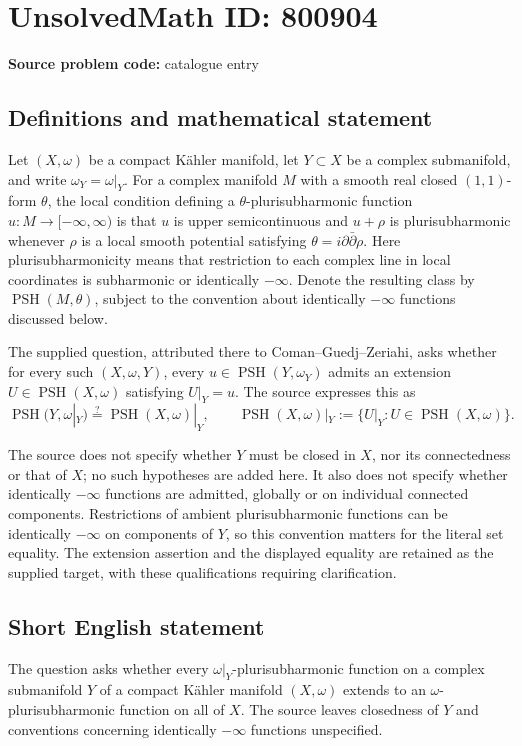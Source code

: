 \documentclass[11pt]{article}
\begin{document}
\section*{UnsolvedMath ID: 800904}
\textbf{Source problem code:} catalogue entry
\subsection{Definitions and mathematical statement}
Let \((X,\omega)\) be a compact K\"ahler manifold, let \(Y\subset X\) be a complex submanifold, and write \(\omega_Y=\omega|_Y\). For a complex manifold \(M\) with a smooth real closed \((1,1)\)-form \(\theta\), the local condition defining a \(\theta\)-plurisubharmonic function \(u:M\to[-\infty,\infty)\) is that \(u\) is upper semicontinuous and \(u+\rho\) is plurisubharmonic whenever \(\rho\) is a local smooth potential satisfying \(\theta=i\partial\bar\partial\rho\). Here plurisubharmonicity means that restriction to each complex line in local coordinates is subharmonic or identically \(-\infty\). Denote the resulting class by \(\operatorname{PSH}(M,\theta)\), subject to the convention about identically \(-\infty\) functions discussed below.

The supplied question, attributed there to Coman--Guedj--Zeriahi, asks whether for every such \((X,\omega,Y)\), every \(u\in\operatorname{PSH}(Y,\omega_Y)\) admits an extension \(U\in\operatorname{PSH}(X,\omega)\) satisfying \(U|_Y=u\). The source expresses this as
\[
\operatorname{PSH}(Y,\omega|_Y)
\stackrel{?}{=}
\operatorname{PSH}(X,\omega)|_Y,
\qquad
\operatorname{PSH}(X,\omega)|_Y
:=\{U|_Y:U\in\operatorname{PSH}(X,\omega)\}.
\]

The source does not specify whether \(Y\) must be closed in \(X\), nor its connectedness or that of \(X\); no such hypotheses are added here. It also does not specify whether identically \(-\infty\) functions are admitted, globally or on individual connected components. Restrictions of ambient plurisubharmonic functions can be identically \(-\infty\) on components of \(Y\), so this convention matters for the literal set equality. The extension assertion and the displayed equality are retained as the supplied target, with these qualifications requiring clarification.
\subsection{Short English statement}
The question asks whether every \(\omega|_Y\)-plurisubharmonic function on a complex submanifold \(Y\) of a compact K\"ahler manifold \((X,\omega)\) extends to an \(\omega\)-plurisubharmonic function on all of \(X\). The source leaves closedness of \(Y\) and conventions concerning identically \(-\infty\) functions unspecified.
\end{document}
